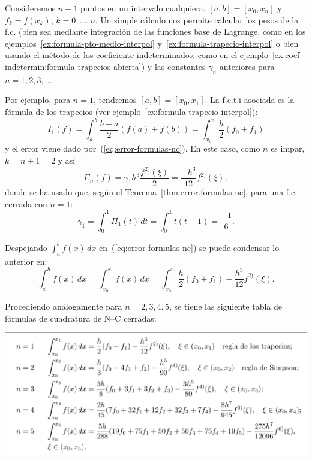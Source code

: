 \begin{example}
  \label{ex:fc-NC-abiertas}
  Consideremos $n+1$ puntos en un intervalo cualquiera,
  $[a,b]=[x_{0},x_{n}]$ y $f_k=f(x_k)$, $k=0,\dots,n$. Un simple
  cálculo nos permite calcular los pesos de la f.c. (bien sea mediante
  integración de las funciones base de Lagrange, como en los
  ejemplos~\ref{ex:formula-pto-medio-interpol}
  y~\ref{ex:formula-trapecio-interpol} o bien usando el método de los
  coeficiente indeterminados, como en el
  ejemplo~\ref{ex:coef-indetermin:formula-trapecios-abierta}) y las
  constantes $\gamma_n$ anteriores para $n=1,2,3,...$.

  Por ejemplo, para $n=1$, tendremos $[a,b]=[x_0,x_1]$. La f.c.t.i
  asociada es la fórmula de los trapecios (ver
  ejemplo~\ref{ex:formula-trapecio-interpol}):
  \begin{equation*}
    I_1(f) = \int_{a}^{b} \frac{b-a}{2}(f(a)+f(b)) 
    = \int_{x_0}^{x_1} \frac{h}{2}(f_0+f_1)
  \end{equation*}
  y el error viene dado por~(\ref{eq:error-formulas-nc}). En este
  caso, como $n$ es impar, $k=n+1=2$ y así
  \begin{equation*}
    E_n(f)=\gamma_1 h^{3}\frac{f^{2)}(\xi)}{2}=\frac{-h^3}{12} f^{2)}(\xi),
  \end{equation*}
  donde se ha usado que, según el Teorema~\ref{thm:error.formulas-nc},
  para una f.c. cerrada con $n=1$:
  \begin{equation*}
    \gamma_1 = \int_0^1 \Pi_1(t)\,dt = \int_0^1 t(t-1) = \frac{-1}{6}.
  \end{equation*}
  
  Despejando $\int_a^b f(x)\,dx$ en~(\ref{eq:error-formulas-nc}) se
  puede condensar lo anterior en:
  \begin{equation*}
    \int_a^b f(x)\,dx = \int_{x_0}^{x_1} f(x)\,dx =
    \int_{x_0}^{x_1} \frac{h}{2}(f_0+f_1) - \frac{h^3}{12} f^{2)}(\xi).
  \end{equation*}

  Procediendo análogamente para $n=2,3,4,5$, se tiene las
  siguiente tabla de fórmulas de cuadratura de N--C cerradas:
  \begin{center}
    \includegraphics[width=0.95\linewidth]{tema3/formulas-nc-cerradas}
  \end{center}
\end{example}

